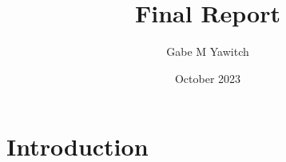 \documentclass{article}
\title{Final Report}
\author{Gabe M Yawitch}
\date{October 2023}
\begin{document}
\maketitle

\section{Introduction}
\end{document}
